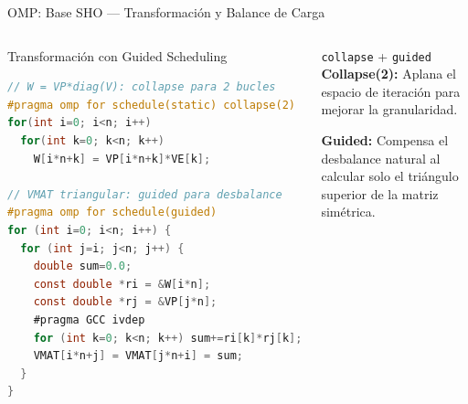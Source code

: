 \documentclass[aspectratio=169,10pt]{beamer}
\begin{document}
\begin{frame}[fragile]{OMP: Base SHO — Transformación y Balance de Carga}

\begin{columns}[T]

\begin{block}{Transformación con Guided Scheduling}
\begin{lstlisting}[language=C,style=cppBeamer,basicstyle=\tiny\ttfamily]
// W = VP*diag(V): collapse para 2 bucles
#pragma omp for schedule(static) collapse(2)
for(int i=0; i<n; i++)
  for(int k=0; k<n; k++)
    W[i*n+k] = VP[i*n+k]*VE[k];

// VMAT triangular: guided para desbalance
#pragma omp for schedule(guided)
for (int i=0; i<n; i++) {
  for (int j=i; j<n; j++) {
    double sum=0.0;
    const double *ri = &W[i*n];
    const double *rj = &VP[j*n];
    #pragma GCC ivdep
    for (int k=0; k<n; k++) sum+=ri[k]*rj[k];
    VMAT[i*n+j] = VMAT[j*n+i] = sum;
  }
}
\end{lstlisting}
\end{block}

\vspace{0.5cm}
\begin{alertbox}{\texttt{collapse} + \texttt{guided}}
\small
\textbf{Collapse(2):} Aplana el espacio de iteración para mejorar la granularidad.

\vspace{0.2cm}
\textbf{Guided:} Compensa el desbalance natural al calcular solo el triángulo superior de la matriz simétrica.
\end{alertbox}

\end{columns}

\end{frame}
\end{document}
